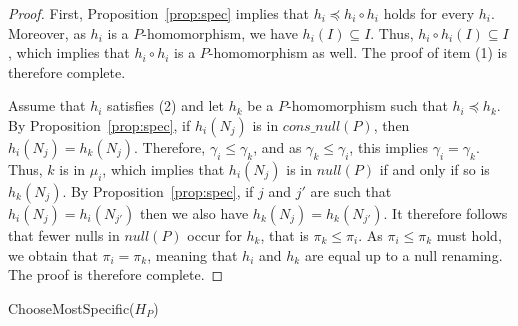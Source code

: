 \begin{otherlanguage}{english}
\begin{proof}
    First, Proposition~\ref{prop:spec} implies that $h_i \preceq h_i \circ h_i$ holds for every $h_i$.
    Moreover, as $h_i$ is a $P$-homomorphism, we have $h_i(I) \subseteq I$.
    Thus, $h_i \circ h_i(I) \subseteq I$, which implies that $h_i \circ h_i$ is a $P$-homomorphism as well.
    The proof of item (1) is therefore complete.

    Assume that $h_i$ satisfies (2) and let $h_k$ be a $P$-homomorphism such that $h_i \preceq h_k$.
    By Proposition~\ref{prop:spec}, if $h_i(N_j)$ is in $cons\_null(P)$, then $h_i(N_j)=h_k(N_j)$.
    Therefore, $\gamma_i \leq \gamma_k$, and as $\gamma_k \leq \gamma_i$, this implies $\gamma_i = \gamma_k$.
    Thus, $k$ is in $\mu_i$, which implies that $h_i(N_j)$ is in $null(P)$ if and only if so is $h_k(N_j)$.
    By Proposition~\ref{prop:spec}, if $j$ and $j'$ are such that $h_i(N_j)=h_i(N_{j'})$ then we also have $h_k(N_j)=h_k(N_{j'})$.
    It therefore follows that fewer nulls in $null(P)$ occur for $h_k$, that is $\pi_k \leq \pi_i$.
    As $\pi_i \leq \pi_k$ must hold, we obtain that $\pi_i = \pi_k$, meaning that $h_i$ and $h_k$ are equal up to a null renaming.
    The proof is therefore complete.
\end{proof}

\begin{procedure}[htb]
    \caption{ChooseMostSpecific($H_P$)}
    \label{algo:update:mostspecific}



\end{procedure}
\end{otherlanguage}
